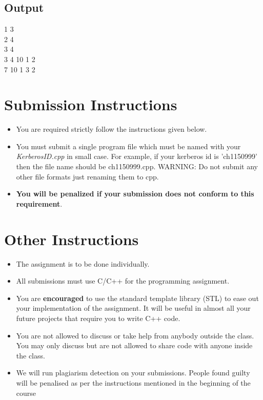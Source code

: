\documentclass[20pt]{article}
\begin{document}
\subsection{Output}
\-\hspace{10mm} 1 3\\
\-\hspace{10mm} 2 4\\
\-\hspace{10mm} 3 4\\
\-\hspace{10mm} 3 4 10 1 2\\
\-\hspace{10mm} 7 10 1 3 2\\

\section{Submission Instructions}
\begin{itemize}
\item You are required strictly follow the instructions given below.
\item You must submit a single program file which must be named with your \textit{KerberosID.cpp} in small case. For example, if your kerberos id is ’ch1150999’ then the file name should be ch1150999.cpp. WARNING: Do not submit any other file formats just renaming them to cpp.
\item \textbf{You will be penalized if your submission does not conform to this requirement}.
\end{itemize}

\section{Other Instructions}
\begin{itemize}
\item The assignment is to be done individually.
\item All submissions must use C/C++ for the programming assignment.
\item You are \textbf{encouraged} to use the standard template library (STL) to ease out your implementation of the assignment. It will be useful in almost all your future projects that require you to write C++ code.
\item You are not allowed to discuss or take help from anybody outside the class. You may only discuss but are not allowed to share code with anyone inside the class.
\item We will run plagiarism detection on your submissions. People found guilty will be penalised as per the instructions mentioned in the beginning of the course
\end{itemize}
\end{document}
